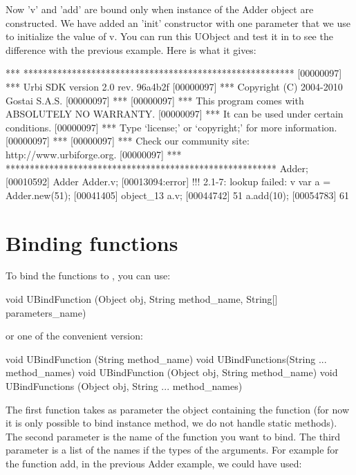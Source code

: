 Now 'v' and 'add' are bound only when instance of the Adder object are
constructed. We have added an 'init' constructor with one parameter that
we use to initialize the value of v. You can run this UObject and test
it in \urbi to see the difference with the previous example. Here is what
it gives:

\begin{urbiunchecked}
[00000097] *** ********************************************************
[00000097] *** Urbi SDK version 2.0 rev. 96a4b2f
[00000097] *** Copyright (C) 2004-2010 Gostai S.A.S.
[00000097] ***
[00000097] *** This program comes with ABSOLUTELY NO WARRANTY.
[00000097] *** It can be used under certain conditions.
[00000097] *** Type `license;' or `copyright;' for more information.
[00000097] ***
[00000097] *** Check our community site: http://www.urbiforge.org.
[00000097] *** ********************************************************
Adder;
[00010592] Adder
Adder.v;
[00013094:error] !!! 2.1-7: lookup failed: v
var a = Adder.new(51);
[00041405] object_13
a.v;
[00044742] 51
a.add(10);
[00054783] 61
\end{urbiunchecked}


\section{Binding functions}
\label{sec:uob:apijava:func}


To bind the functions to \urbi, you can use:
\begin{java}
void UBindFunction (Object obj, String method_name, String[] parameters_name)
\end{java}
or one of the convenient version:
\begin{java}
void UBindFunction (String method_name)
void UBindFunctions(String ... method_names)
void UBindFunction (Object obj, String method_name)
void UBindFunctions (Object obj, String ... method_names)
\end{java}

The first function takes as parameter the object containing the function
(for now it is only possible to bind instance method, we do not handle static
methods). The second parameter is the name of the function you want to bind.
The third parameter is a list of the names if the types of the arguments.
For example for the function add, in the previous Adder example, we could have
used:

